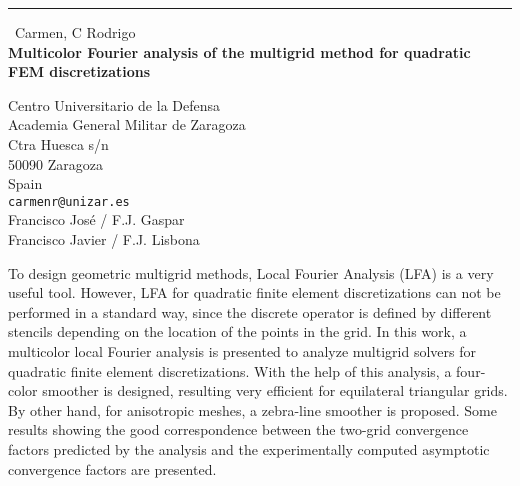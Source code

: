 \documentclass{report}
\begin{document}
\begin{center}
\rule{6in}{1pt} \
{\large Carmen, C Rodrigo \\
{\bf Multicolor Fourier analysis of the multigrid method for quadratic FEM discretizations}}

Centro Universitario de la Defensa \\ Academia General Militar de Zaragoza \\ Ctra Huesca s/n \\ 50090 Zaragoza \\ Spain
\\
{\tt carmenr@unizar.es}\\
Francisco José / F.J. Gaspar\\
Francisco Javier / F.J. Lisbona\end{center}

To design geometric multigrid methods, Local Fourier Analysis (LFA) is a
very useful tool. However, LFA for quadratic finite element
discretizations can not be performed in a standard way, since the
discrete operator is defined by different stencils depending on the
location of the points in the grid. In this work, a multicolor local
Fourier analysis is presented to analyze multigrid solvers for quadratic
finite element discretizations. With the help of this analysis, a
four-color smoother is designed, resulting very efficient for equilateral
triangular grids. By other hand, for anisotropic meshes, a zebra-line
smoother is proposed. Some results showing the good correspondence
between the two-grid convergence factors predicted by the analysis and
the experimentally computed asymptotic convergence factors are presented.
\end{document}
